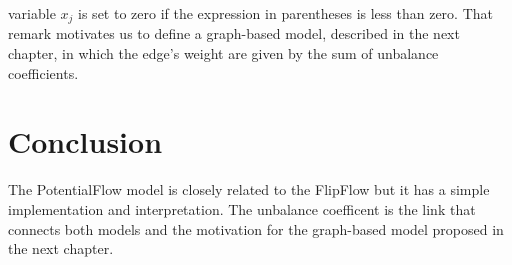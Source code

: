variable $x_j$ is set to zero if the expression in parentheses is less than zero. That remark motivates us to define a graph-based model, described in the next chapter, in which the edge's weight are given by the sum of unbalance coefficients.


\section{Conclusion}
The PotentialFlow model is closely related to the FlipFlow but it has a simple implementation and interpretation. The unbalance coefficent is the link that connects both models and the motivation for the graph-based model proposed in the next chapter.




